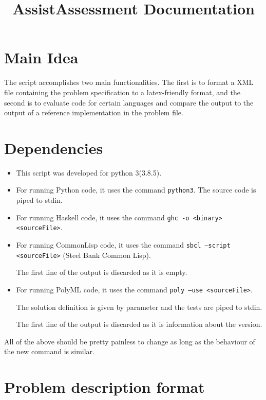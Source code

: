 \documentclass[a4paper,12pt]{article}
\title{AssistAssessment Documentation}
\author{}
\date{}
\begin{document}
    
\maketitle

\section{Main Idea}

The script accomplishes two main functionalities. The first is to format a XML file containing the problem specification to a latex-friendly format, and the second is to evaluate code for certain languages and compare the output to the output of a reference implementation in the problem file.

\section{Dependencies}

\begin{itemize}
 \item This script was developed for python 3(3.8.5).
 
 \item For running Python code, it uses the command \texttt{python3}. The source code is piped to stdin.
 
 \item For running Haskell code, it uses the command \texttt{ghc -o <binary> <sourceFile>}.
 
 \item For running CommonLisp code, it uses the command \texttt{sbcl --script <sourceFile>} (Steel Bank Common Lisp).
 
 The first line of the output is discarded as it is empty.
 
 \item For running PolyML code, it uses the command \texttt{poly --use <sourceFile>}. 
 
 The solution definition is given by parameter and the tests are piped to stdin. 
 
 The first line of the output is discarded as it is information about the version.
\end{itemize}

All of the above should be pretty painless to change as long as the behaviour of the new command is similar.



\section{Problem description format}
\end{document}
